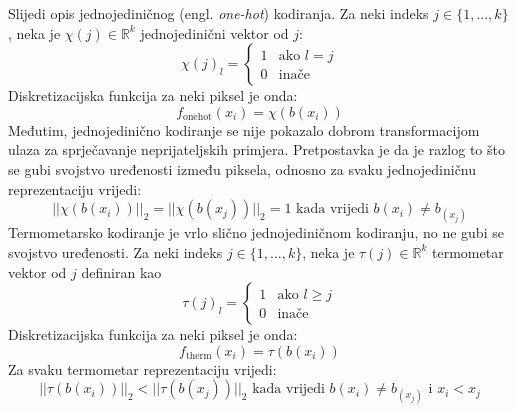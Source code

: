 \documentclass[utf8, diplomski]{fer}
\begin{document}
Slijedi opis jednojediničnog (engl. \textit{one-hot}) kodiranja. Za neki indeks $j \in \{1, ..., k\}$, neka je $\chi(j) \in \mathbb{R}^{k}$ jednojedinični vektor od $j$:
\begin{equation}
	\chi(j)_{l} = 
	\begin{cases}
      1 & \text{ako } l = j \\
      0 & \text{inače}
    \end{cases}     
\end{equation}
Diskretizacijska funkcija za neki piksel je onda:
\begin{equation}
	f_{\text{onehot}}(x_{i}) = \chi(b(x_{i}))
\end{equation}
Međutim, jednojedinično kodiranje se nije pokazalo dobrom transformacijom ulaza za sprječavanje neprijateljskih primjera. Pretpostavka je da je razlog to što se gubi svojstvo uređenosti između piksela, odnosno za svaku jednojediničnu reprezentaciju vrijedi:
\begin{equation}
	||\chi(b(x_{i}))||_{2} = ||\chi(b(x_{j}))||_{2} = 1 \text{ kada vrijedi } b(x_{i}) \neq b_(x_{j})
\end{equation}
Termometarsko kodiranje je vrlo slično jednojediničnom kodiranju, no ne gubi se svojstvo uređenosti. Za neki indeks $j \in \{1, ..., k\}$, neka je $\tau(j) \in \mathbb{R}^{k}$ termometar vektor od $j$ definiran kao
\begin{equation}
	\tau(j)_{l} = 
	\begin{cases}
      1 & \text{ako } l \geq j \\
      0 & \text{inače}
    \end{cases}     
\end{equation}
Diskretizacijska funkcija za neki piksel je onda:
\begin{equation}
	f_{\text{therm}}(x_{i}) = \tau(b(x_{i}))
\end{equation}
Za svaku termometar reprezentaciju vrijedi:
\begin{equation}
	||\tau(b(x_{i}))||_{2} < ||\tau(b(x_{j}))||_{2} \text{ kada vrijedi } b(x_{i}) \neq b_(x_{j}) \text{ i } x_{i} < x_{j}
\end{equation}
\end{document}
